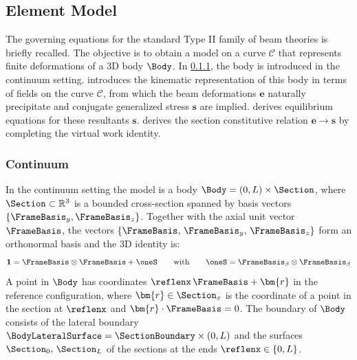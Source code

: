 \subsection{Element Model}\label{sec:genwarp}

The governing equations for the standard Type II family of beam theories is briefly recalled. The objective is to obtain a model on a curve \(\mathcal{C}\) that represents finite deformations of a 3D body \(\Body\).
In \cref{sec:std-continuum}, the body is introduced in the continuum setting.  introduces the kinematic representation of this body in terms of fields on the curve \(\mathcal{C}\), from which the beam deformations \(\bm{e}\) naturally precipitate and conjugate generalized stress \(\bm{s}\) are implied.  derives equilibrium equations for these resultants \(\bm{s}\).  derives the section constitutive relation \(\bm{e}\rightarrow\bm{s}\) by completing the virtual work identity.

\subsubsection{Continuum}\label{sec:std-continuum}
In the continuum setting the model is a body
\(
\Body=(0,L)\times\Section
\),
where \(\Section\subset\mathbb{R}^3\) is a bounded cross-section
spanned by basis vectors \(\{\FrameBasis_y,\FrameBasis_z\}\).%
Together with the axial unit vector \(\FrameBasis\), the vectors \(\{\FrameBasis,\,\FrameBasis_y,\,\FrameBasis_z\}\) form an orthonormal basis and the 3D identity is:
\[
\mathbf{1}=\FrameBasis\otimes\FrameBasis+\oneS
\qquad\text{with}\qquad
\oneS=\FrameBasis_{\beta}\otimes\FrameBasis_{\beta}
\]
A point in \(\Body\) has coordinates \(\reflenx\,\FrameBasis + \bm{r}\) in the reference configuration, where \(\bm{r} \in\Section_x\) is the coordinate of a point in the section at \(\reflenx\) and \(\bm{r}\cdot\FrameBasis = 0\).
The boundary of \(\Body\) consists of the lateral boundary \(\BodyLateralSurface=\SectionBoundary\times(0,L)\) and the surfaces \(\Section_0,\,\Section_L\) of the sections at the ends \(\reflenx \in \{0,L\}\).  

